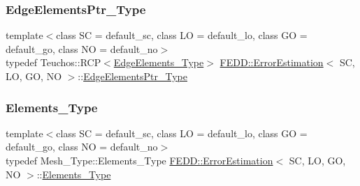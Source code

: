 \mbox{\label{classFEDD_1_1ErrorEstimation_ac7ab89f64446e4c6e739058240497f04}} 
\subsubsection{\texorpdfstring{Edge\+Elements\+Ptr\+\_\+\+Type}{EdgeElementsPtr\_Type}}
{\footnotesize\ttfamily template$<$class SC  = default\+\_\+sc, class LO  = default\+\_\+lo, class GO  = default\+\_\+go, class NO  = default\+\_\+no$>$ \\
typedef Teuchos\+::\+R\+CP$<$\hyperlink{classFEDD_1_1ErrorEstimation_a8014e1e4844351d77d667159034e7523}{Edge\+Elements\+\_\+\+Type}$>$ \hyperlink{classFEDD_1_1ErrorEstimation}{F\+E\+D\+D\+::\+Error\+Estimation}$<$ SC, LO, GO, NO $>$\+::\hyperlink{classFEDD_1_1ErrorEstimation_ac7ab89f64446e4c6e739058240497f04}{Edge\+Elements\+Ptr\+\_\+\+Type}}

\mbox{\label{classFEDD_1_1ErrorEstimation_ac074c6f1011aead7c9b786ab33b23978}} 
\subsubsection{\texorpdfstring{Elements\+\_\+\+Type}{Elements\_Type}}
{\footnotesize\ttfamily template$<$class SC  = default\+\_\+sc, class LO  = default\+\_\+lo, class GO  = default\+\_\+go, class NO  = default\+\_\+no$>$ \\
typedef Mesh\+\_\+\+Type\+::\+Elements\+\_\+\+Type \hyperlink{classFEDD_1_1ErrorEstimation}{F\+E\+D\+D\+::\+Error\+Estimation}$<$ SC, LO, GO, NO $>$\+::\hyperlink{classFEDD_1_1ErrorEstimation_ac074c6f1011aead7c9b786ab33b23978}{Elements\+\_\+\+Type}}

\mbox{\label{classFEDD_1_1ErrorEstimation_a4a9dbcc947775568cce988cb4a68a40b}} 
